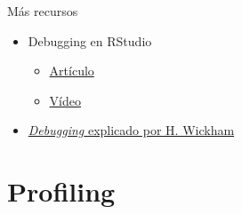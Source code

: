 \documentclass[xcolor={usenames,svgnames,dvipsnames}]{beamer}
\begin{document}
\begin{frame}[label={sec:org623705e}]{Más recursos}
\begin{itemize}
\item Debugging en RStudio
\begin{itemize}
\item \href{https://support.rstudio.com/hc/en-us/articles/205612627-Debugging-with-RStudio}{Artículo}
\item \href{https://vimeo.com/97831988}{Vídeo}
\end{itemize}
\item \href{http://adv-r.had.co.nz/Exceptions-Debugging.html}{\emph{Debugging} explicado por H. Wickham}
\end{itemize}
\end{frame}

\section{Profiling}
\label{sec:orgd98d342}
\end{document}
